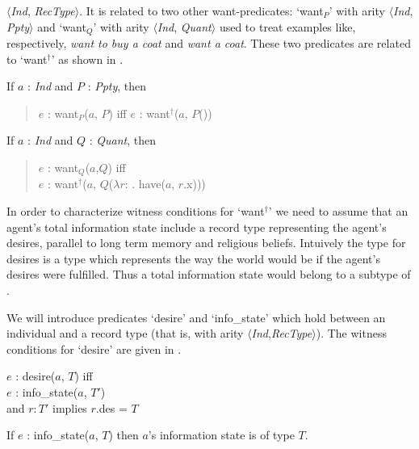 $\langle$\textit{Ind}, \textit{RecType}$\rangle$.  It is related to
two other want-predicates: `want$_P$' with arity
$\langle$\textit{Ind}, \textit{Ppty}$\rangle$ and `want$_Q$' with
arity $\langle$\textit{Ind}, \textit{Quant}$\rangle$ used to treat
examples like,
respectively, \textit{want to buy a coat} and \textit{want a coat}.
These two predicates are related to `want$^\dagger$' as shown in
\nexteg{}.
\begin{ex} 
\begin{subex} 
 
\item If $a$ : \textit{Ind} and $P$ : \textit{Ppty}, then 
\begin{quote}
$e$ : want$_P$($a$, $P$) iff $e$ : want$^\dagger$($a$, $P$())
\end{quote} 
 
\item If $a$ : \textit{Ind} and $Q$ : \textit{Quant}, then 
\begin{quote}
$e$ : want$_Q$($a$,$Q$) iff \\
\hspace*{2em}$e$ : want$^\dagger$($a$, $Q$($\lambda
r$: . have($a$, $r$.x)))
\end{quote} 
 
\end{subex} 
   
\end{ex} 

In order to characterize witness conditions for `want$^{\dagger}$' we
need to assume that an agent's total information state include a
record type representing the agent's desires, parallel to long term
memory and religious beliefs.  Intuively the type for desires is a
type which represents the way the world would be if the agent's
desires were fulfilled.  Thus a total information state would belong
to a subtype of \nexteg{}.
\begin{ex} 
\end{ex} 
We will introduce predicates `desire' and `info\_state' which hold between an
individual and a record type (that is, with arity
$\langle$\textit{Ind},\textit{RecType}$\rangle$).  The witness
conditions for `desire' are given in \nexteg{}.
\begin{ex} 
$e$ : desire($a$, $T$) iff\\
\hspace*{2em} $e$ : info\_state($a$, $T'$) \\
\hspace*{2em} and $r:T'$ implies $r$.des = $T$
\end{ex} 
If $e$ : info\_state($a$, $T$) then $a$'s information state is of type
$T$. 

